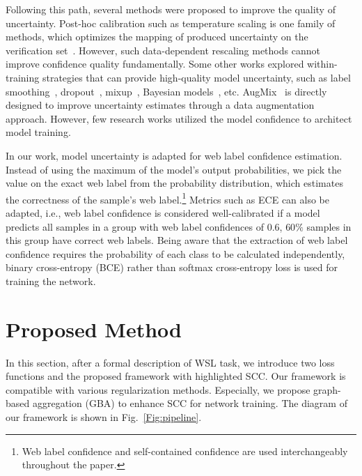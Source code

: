 \documentclass[runningheads]{llncs}
\begin{document}
Following this path, several methods were proposed to improve the quality of uncertainty. Post-hoc calibration such as temperature scaling is one family of methods, which optimizes the mapping of produced uncertainty on the verification set~\cite{guo2017calibration}. However, such data-dependent rescaling methods cannot improve confidence quality fundamentally. Some other works explored within-training strategies that can provide high-quality model uncertainty, such as label smoothing~\cite{muller2019does}, dropout~\cite{gal2016dropout}, mixup~\cite{thulasidasan2019mixup}, Bayesian models~\cite{lakshminarayanan2017simple}, etc. AugMix~\cite{hendrycks2020augmix} is directly designed to improve uncertainty estimates through a data augmentation approach. However, few research works utilized the model confidence to architect model training.

In our work, model uncertainty is adapted for web label confidence estimation. Instead of using the maximum of the model's output probabilities, we pick the value on the exact web label from the probability distribution, which estimates the correctness of the sample's web label.\footnote{Web label confidence and self-contained confidence are used interchangeably throughout the paper.} Metrics such as ECE can also be adapted, i.e., web label confidence is considered well-calibrated if a model predicts all samples in a group with web label confidences of $0.6$, $60\%$ samples in this group have correct web labels. Being aware that the extraction of web label confidence requires the probability of each class to be calculated independently, binary cross-entropy (BCE) rather than softmax cross-entropy loss is used for training the network. 


\section{Proposed Method}
In this section, after a formal description of WSL task, we introduce two loss functions and the proposed framework with highlighted SCC. Our framework is compatible with various regularization methods. Especially, we propose graph-based aggregation (GBA) to enhance SCC for network training. The diagram of our framework is shown in Fig.~\ref{Fig:pipeline}.
	
\end{document}
